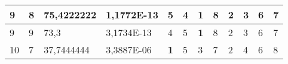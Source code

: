 \documentclass[conference]{IEEEtran}
\begin{document}
\begin{table*}[]
\begin{tabular}{|llll|llllllll|}
\multicolumn{1}{|l|}{9}                                                     & \multicolumn{1}{l|}{8}                                                        & \multicolumn{1}{l|}{75,4222222}                                                   & 1,1772E-13                     & \multicolumn{1}{l|}{5}                                                  & \multicolumn{1}{l|}{4}                                                  & \multicolumn{1}{l|}{\textbf{1}}                                         & \multicolumn{1}{l|}{8}                                                  & \multicolumn{1}{l|}{2}                                                  & \multicolumn{1}{l|}{3}                                                  & \multicolumn{1}{l|}{6}                                                  & 7                          \\ \hline
\multicolumn{1}{|l|}{9}                                                     & \multicolumn{1}{l|}{9}                                                        & \multicolumn{1}{l|}{73,3}                                                         & 3,1734E-13                     & \multicolumn{1}{l|}{4}                                                  & \multicolumn{1}{l|}{5}                                                  & \multicolumn{1}{l|}{\textbf{1}}                                         & \multicolumn{1}{l|}{8}                                                  & \multicolumn{1}{l|}{2}                                                  & \multicolumn{1}{l|}{3}                                                  & \multicolumn{1}{l|}{6}                                                  & 7                          \\ \hline
\multicolumn{1}{|l|}{10}                                                    & \multicolumn{1}{l|}{7}                                                        & \multicolumn{1}{l|}{37,7444444}                                                   & 3,3887E-06                     & \multicolumn{1}{l|}{\textbf{1}}                                         & \multicolumn{1}{l|}{5}                                                  & \multicolumn{1}{l|}{3}                                                  & \multicolumn{1}{l|}{7}                                                  & \multicolumn{1}{l|}{2}                                                  & \multicolumn{1}{l|}{4}                                                  & \multicolumn{1}{l|}{6}                                                  & 8                          \\ \hline

\end{tabular}
\end{table*}
\end{document}
